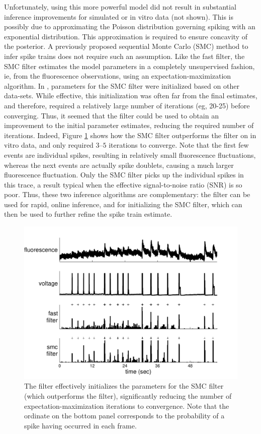 Unfortunately, using this more powerful model did not result in substantial inference improvements for simulated or in vitro data (not shown).  This is possibly due to approximating the Poisson distribution governing spiking with an exponential distribution.  This approximation is required to ensure concavity of the posterior.  A previously proposed sequential Monte Carlo (SMC) method to infer spike trains \cite{VogelsteinPaninski09} does not require such an assumption. Like the fast filter, the SMC filter estimates the model parameters in a completely unsupervised fashion, ie, from the fluorescence observations, using an expectation-maximization algorithm.  In \cite{VogelsteinPaninski09}, parameters for the SMC filter were initialized based on other data-sets.  While effective, this initialization was often far from the final estimates, and therefore, required a relatively large number of iterations (eg, 20-25) before converging.  Thus, it seemed that the \foopsi filter could be used to obtain an improvement to the initial parameter estimates, reducing the required number of iterations.  Indeed, Figure \ref{fig:smc_init} shows how the SMC filter outperforms the \foopsi filter on in vitro data, and only required $3$--$5$ iterations to converge.  Note that the first few events are individual spikes, resulting in relatively small fluorescence fluctuations, whereas the next events are actually spike doublets, causing a much larger fluorescence fluctuation.  Only the SMC filter picks up the individual spikes in this trace, a result typical when the effective signal-to-noise ratio (SNR) is so poor.  Thus, these two inference algorithms are complementary: the \foopsi filter can be used for rapid, online inference, and for initializing the SMC filter, which can then be used to further refine the spike train estimate.

\begin{figure}[h!]
\centering \includegraphics[width=.9\linewidth]{../figs/smc_init12}
\caption{The \foopsi filter effectively initializes the parameters for the SMC filter (which outperforms the \foopsi filter), significantly reducing the number of expectation-maximization iterations to convergence.  Note that the ordinate on the bottom panel corresponds to the probability of a spike having occurred in each frame.} \label{fig:smc_init}
\end{figure}

